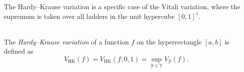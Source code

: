 The Hardy--Krause variation is a specific case of the Vitali variation, where
the supremum is taken over all ladders in the unit hypercube $[0,1]^s$.

\begin{definition} \ \\
    The \emph{Hardy--Krause variation} of a function $f$ on the hyperrectangle
    $[a,b]$ is defined as
    \begin{equation*}
        V_{\mathrm{HK}}(f) = V_{\mathrm{HK}}(f; 0, 1) = \sup_{\mathcal{Y} \in 
        \mathbb{Y}} V_\mathcal{Y}(f).
    \end{equation*}
\end{definition}












